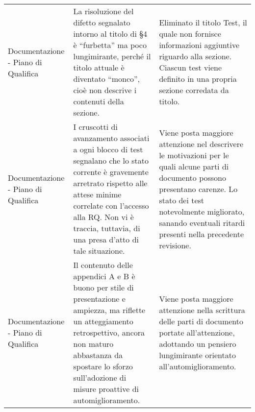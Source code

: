 \begin{longtable}{ 
					>{\centering}p{} 
					>{\centering}p{}
					>{\centering\arraybackslash}p{}}
				
				Documentazione - Piano di Qualifica
				&
				La risoluzione del difetto segnalato intorno al titolo di §4 è “furbetta” ma poco lungimirante, perché il titolo attuale è diventato “monco”, cioè non descrive i contenuti della sezione. 
				&
				Eliminato il titolo Test, il quale non fornisce informazioni aggiuntive riguardo alla sezione. Ciascun test viene definito in una propria sezione corredata da titolo. 
				\\
				
				
				Documentazione - Piano di Qualifica
				&
				I cruscotti di avanzamento associati a ogni blocco di test segnalano che lo stato corrente è gravemente arretrato rispetto alle attese minime correlate con l’accesso alla RQ. Non vi è traccia, tuttavia, di una presa d’atto di tale situazione.
				&
				Viene posta maggiore attenzione nel descrivere le motivazioni per le quali alcune parti di documento possono presentano carenze. Lo stato dei test notevolmente migliorato, sanando eventuali ritardi presenti nella precedente revisione.
				\\
				
				
				Documentazione - Piano di Qualifica
				&
				Il contenuto delle appendici A e B è buono per stile di presentazione e ampiezza, ma riflette un atteggiamento retrospettivo, ancora non maturo abbastanza da spostare lo sforzo sull’adozione di misure proattive di automiglioramento.
				&
				Viene posta maggiore attenzione nella scrittura delle parti di documento portate all'attenzione, adottando un pensiero lungimirante orientato all'automiglioramento.
				\\
				
				
			\end{longtable}
			
